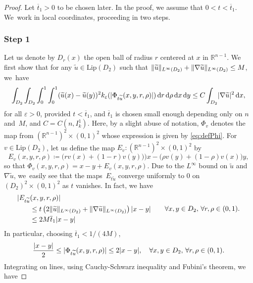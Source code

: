 \documentclass[JEP,XML,SOM,Unicode,published]{cedram}
\numberwithin{equation}{section}
\theoremstyle{plain}
\theoremstyle{definition}
\newcommand{\numberset}[1]{{\mathbb{#1}}}
\newcommand{\R}{\numberset{R}}
\newcommand{\dd}{\mathop{}\mathopen{}\mathrm{d}}
\newcommand{\dx}{\mathop{}\mathopen{}\mathrm{d}x}
\newcommand{\dy}{\mathop{}\mathopen{}\mathrm{d}y}
\newcommand{\dr}{\mathop{}\mathopen{}\mathrm{d}r}
\let\eps\varepsilon
\let\ol\overline
\let\wt\widetilde
\newcommand{\Lip}{{\mathrm{Lip}}}
\newcommand{\grad}{\nabla}
\DeclarePairedDelimiter{\abs}{\lvert}{\rvert}
\DeclarePairedDelimiter{\norm}{\lVert}{\rVert}
\begin{document}
\begin{proof}
Let $\ol{t}_1>0$ to be chosen later. In the proof, we assume that $0<t<\ol{t}_1$.
We~work in local coordinates, proceeding in two steps.

\subsubsection*{Step 1}
Let us denote by $D_r(x)$ the open ball of radius $r$ centered at $x$ in $\R^{n-1}$. We first show
that for any $\wt{u}\in\Lip(D_2)$ such that $\norm{\wt{u}}_{L^\infty(D_2)}+\norm{\grad
\wt{u}}_{L^\infty(D_2)}\leq M$, we~have
\begin{equation}\label{techlem1:eqstep1}
\int_{D_2}\int_{D_2}\int_0^1\int_0^1 (\wt{u}(x)-\wt{u}(y))^2
k_\eps(\abs{\Phi_{t\wt{u}}(x,y,r,\rho)})\dr\dd\rho\dx\dy
\leq C\int_{D_2} \abs{\grad \wt{u}}^2\dx,
\end{equation}
for all $\eps>0$, provided $t<\ol{t}_1$, and $\ol{t}_1$ is chosen small enough depending only on
$n$ and~$M$, and $C=C(n,I_k^1)$. Here, by a slight abuse of notation, $\Phi_v$ denotes the map from
$\left(\R^{n-1}\right)^2\times(0,1)^2$ whose expression is given by \cref{eq:defPhi}.
For $v\in\Lip(D_2)$, let us define the map $E_v:\left(\R^{n-1}\right)^2\times (0,1)^2$ by
\[
E_v(x,y,r,\rho) \coloneqq \big(rv(x)+(1-r)v(y))\big)x-\big(\rho v(y)+(1-\rho)v(x)\big)y,
\]
so that $\Phi_v(x,y,r,\rho)=x-y+E_v(x,y,r,\rho)$.
Due to the $L^\infty$ bound on $\wt{u}$ and $\grad \wt{u}$, we~easily see that the
maps~$E_{t\wt{u}}$ converge uniformly to $0$ on $(D_2)^2\times (0,1)^2$ as $t$ vanishes.
In fact, we have\vspace*{-1pt}
\begin{equation}\label{techlem1:eq1}
\begin{aligned}
|E_{t\wt{u}}&(x,y,r,\rho)|\\
&\leq t\left(2\norm{\wt{u}}_{L^\infty(D_2)}+\norm{\grad\wt{u}}_{L^\infty(D_2)}\right)
\abs{x-y}\\
&\leq 2M\ol{t}_1\abs{x-y}
\end{aligned}
\qquad\forall x,y\in D_2,\,\forall r,\rho\in(0,1).
\end{equation}
In particular, choosing $\ol{t}_1<1/(4M)$,\vspace*{-2pt}
\begin{equation}\label{techlem1:eq2}
\frac{\abs{x-y}}{2}\leq \abs{\Phi_{t\wt{u}}(x,y,r,\rho)} \leq 2\abs{x-y},\quad\forall x,y\in
D_2,\,\forall r,\rho\in(0,1).
\end{equation}
Integrating on lines, using Cauchy-Schwarz inequality and Fubini's theorem, we have\vspace*{-5pt}

\end{proof}
\end{document}
